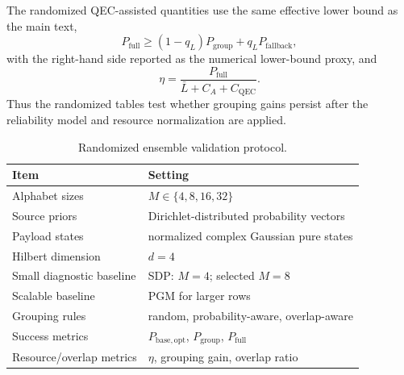 \documentclass[
 reprint,
 amsmath,amssymb,
 aps,
 pra,
 floatfix,
]{revtex4-2}
\begin{document}
The randomized QEC-assisted quantities use the same effective lower bound as the main text,
\begin{equation}
    P_{\mathrm{full}}\geq(1-q_L)P_{\mathrm{group}}+q_LP_{\mathrm{fallback}},
\end{equation}
with the right-hand side reported as the numerical lower-bound proxy, and
\begin{equation}
    \eta=\frac{P_{\mathrm{full}}}{\bar L+C_A+C_{\mathrm{QEC}}}.
\end{equation}
Thus the randomized tables test whether grouping gains persist after the reliability model and resource normalization are applied.

\begin{table}[!htb]
\caption{\label{tab:appendix_randomized_protocol}Randomized ensemble validation protocol.}
\scriptsize
\begin{ruledtabular}
\begin{tabular}{ll}
Item & Setting\\
\hline
Alphabet sizes & \(M\in\{4,8,16,32\}\)\\
Source priors & Dirichlet-distributed probability vectors\\
Payload states & normalized complex Gaussian pure states\\
Hilbert dimension & \(d=4\)\\
Small diagnostic baseline & SDP: \(M=4\); selected \(M=8\)\\
Scalable baseline & PGM for larger rows\\
Grouping rules & random, probability-aware, overlap-aware\\
Success metrics & \(P_{\mathrm{base,opt}}\), \(P_{\mathrm{group}}\), \(P_{\mathrm{full}}\)\\
Resource/overlap metrics & \(\eta\), grouping gain, overlap ratio\\
\end{tabular}
\end{ruledtabular}
\end{table}
\end{document}
